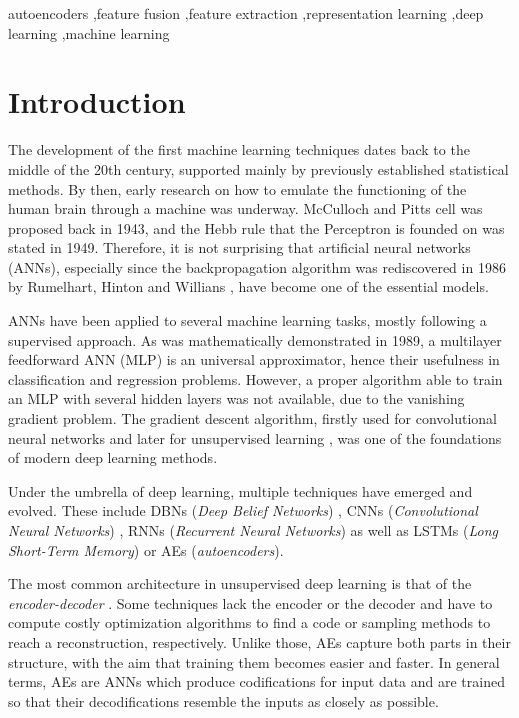 \documentclass[preprint,5p,compress]{elsarticle}
\begin{document}
\begin{frontmatter}
\begin{keyword}
autoencoders \sep feature fusion \sep feature extraction \sep representation learning \sep deep learning \sep machine learning
\end{keyword}

\end{frontmatter}

\section{Introduction}
The development of the first machine learning techniques dates back to the middle of the 20th century, supported mainly by previously established statistical methods. By then, early research on how to emulate the functioning of the human brain through a machine was underway. McCulloch and Pitts cell \cite{McCullochPitts} was proposed back in 1943, and the Hebb rule \cite{HebbRule} that the Perceptron \cite{Perceptron} is founded on was stated in 1949. Therefore, it is not surprising that artificial neural networks (ANNs), especially since the backpropagation algorithm was rediscovered in 1986 by Rumelhart, Hinton and Willians \cite{Backpropagation}, have become one of the essential models. 

ANNs have been applied to several machine learning tasks, mostly following a supervised approach. As was mathematically demonstrated \cite{ANNsUniversalApproximator} in 1989, a multilayer feedforward ANN (MLP) is an universal approximator, hence their usefulness in classification and regression problems. However, a proper algorithm able to train an MLP with several hidden layers was not available, due to the vanishing gradient \cite{VanishingGradient} problem. The gradient descent algorithm, firstly used for convolutional neural networks \cite{LeCunBackpropagation} and later for unsupervised learning \cite{HintonDBN}, was one of the foundations of modern deep learning \cite{DeepLearning} methods.

Under the umbrella of deep learning, multiple techniques have emerged and evolved. These include DBNs (\textit{Deep Belief Networks}) \cite{DBNs}, CNNs (\textit{Convolutional Neural Networks}) \cite{CNNs}, RNNs (\textit{Recurrent Neural Networks}) \cite{RNN} as well as LSTMs (\textit{Long Short-Term Memory}) \cite{LSTMs} or AEs (\textit{autoencoders}).

The most common architecture in unsupervised deep learning is that of the \textit{encoder-decoder} \cite{EnergyUnsupervised}. Some techniques lack the encoder or the decoder and have to compute costly optimization algorithms to find a code or sampling methods to reach a reconstruction, respectively. Unlike those, AEs capture both parts in their structure, with the aim that training them becomes easier and faster. In general terms, AEs are ANNs which produce codifications for input data and are trained so that their decodifications resemble the inputs as closely as possible.
\end{document}
